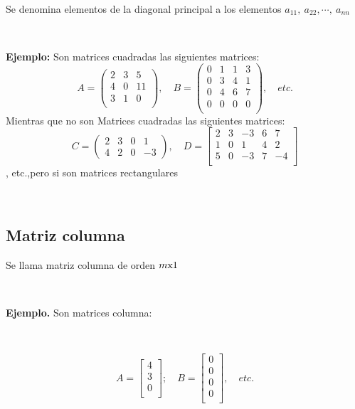 \documentclass[11pt, conference]{IEEEtran}
\begin{document}
{\

Se denomina elementos de la diagonal principal a los elementos $a_{11},\ a_{22}, \cdots,\ a_{nn}$

\

\smallskip
\textbf{Ejemplo:} \textnormal{Son matrices cuadradas las siguientes matrices:}
\[
	A = \left(
    \begin{array}{ccc}
    2 & 3 & 5 \\
    4 & 0 & 11 \\
    3 & 1 & 0 \\
    \end{array}
    \right),\quad 
    B = \left(
    \begin{array}{cccc}
    0 & 1 & 1 & 3 \\
    0 & 3 & 4 & 1 \\
    0 & 4 & 6 & 7 \\
    0 & 0 & 0 & 0 \\
    \end{array}
    \right),\quad etc.
\]
Mientras que no son Matrices cuadradas las siguientes matrices:
\[
	C = \left(
    \begin{array}{cccc}
    	2 & 3 & 0 & 1 \\
        4 & 2 & 0 & -3
    \end{array}
    \right),\quad
    D = \left[
    \begin{array}{ccccc}
		2 & 3 & -3 & 6 & 7 \\
        1 & 0 & 1 & 4 & 2 \\
        5 & 0 & -3 & 7 & -4 \\
	\end{array}	
    \right]\]
, etc.,pero si son matrices rectangulares

\

\subsection{Matriz columna}
Se llama matriz columna de orden $m \textnormal{x} 1$

\

\textbf{Ejemplo.} Son matrices columna:

\

\[
	A = \left[
	\begin{array}{c}
    	4\\
        3\\
        0\\
    \end{array}
    \right];\quad
    B = \left[
	\begin{array}{c}
    	0\\
        0\\
        0\\
        0\\
    \end{array}
	\right],\quad etc.
\]
}
\end{document}
